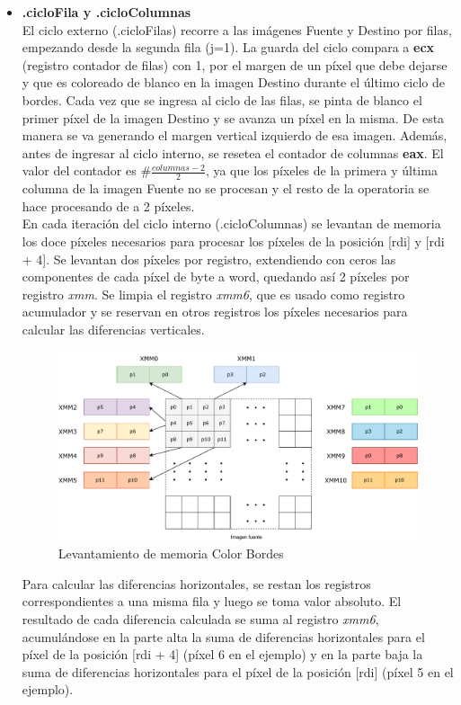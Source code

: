 \documentclass[a4paper]{article}
\begin{document}
\begin{itemize}
	\item \textbf{.cicloFila y .cicloColumnas}\\
	El ciclo externo (.cicloFilas) recorre a las imágenes Fuente y Destino por filas, empezando desde la segunda fila (j=1). La guarda del ciclo compara a \textbf{ecx} (registro contador de filas) con 1, por el margen de un píxel que debe dejarse y que es coloreado de blanco en la imagen Destino durante el último ciclo de bordes. Cada vez que se ingresa al ciclo de las filas, se pinta de blanco el primer píxel de la imagen Destino y se avanza un píxel en la misma. De esta manera se va generando el margen vertical izquierdo de esa imagen. Además, antes de ingresar al ciclo interno, se resetea el contador de columnas \textbf{eax}. El valor del contador es $\#\frac{columnas-2}{2}$, ya que los píxeles de la primera y última columna de la imagen Fuente no se procesan y 
	el resto de la operatoria se hace procesando de a 2 píxeles.\\
	En cada iteración del ciclo interno (.cicloColumnas) se levantan de memoria los doce píxeles necesarios para procesar los píxeles de la posición [rdi] y [rdi + 4]. Se levantan dos píxeles por registro, extendiendo con ceros las componentes de cada píxel de byte a word, quedando así 2 píxeles por registro \textit{xmm}. Se limpia el registro \textit{xmm6}, que es usado como registro acumulador y se reservan en otros registros los píxeles necesarios para calcular las diferencias verticales.
	\begin{figure}[h]
		\centering
		\includegraphics[scale=0.6]{img/LevColorBordes.pdf}
		\caption{Levantamiento de memoria Color Bordes}
	\end{figure}
	
	Para calcular las diferencias horizontales, se restan los registros correspondientes a una misma fila y luego se toma valor absoluto. El resultado de cada diferencia calculada se suma al registro \textit{xmm6}, acumulándose en la parte alta la suma de diferencias horizontales para el píxel de la posición [rdi + 4] (píxel 6 en el ejemplo) y en la parte baja la suma de diferencias horizontales para el píxel de la posición [rdi] (píxel 5 en el ejemplo).
	

\end{itemize}
\end{document}
